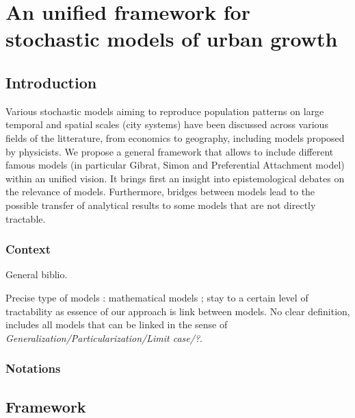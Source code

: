 



\section{An unified framework for stochastic models of urban growth}




\subsection{Introduction}

Various stochastic models aiming to reproduce population patterns on large temporal and spatial scales (city systems) have been discussed across various fields of the litterature, from economics to geography, including models proposed by physicists. We propose a general framework that allows to include different famous models (in particular Gibrat, Simon and Preferential Attachment model) within an unified vision. It brings first an insight into epistemological debates on the relevance of models. Furthermore, bridges between models lead to the possible transfer of analytical results to some models that are not directly tractable.


\subsubsection{Context}

General biblio.

Precise type of models : mathematical models ; stay to a certain level of tractability as essence of our approach is link between models. No clear definition, includes all models that can be linked in the sense of \emph{Generalization/Particularization/Limit case/?}.


\subsubsection{Notations}



\subsection{Framework}


